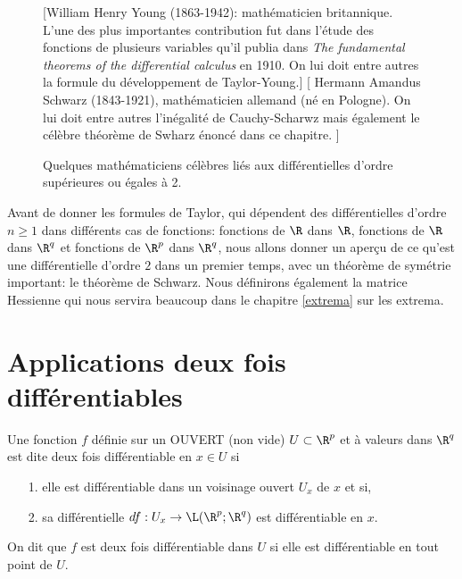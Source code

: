 \documentclass[class=report,crop=false]{standalone}
\begin{document}
\begin{figure}[!h]
    [William Henry Young (1863-1942): mathématicien britannique. L'une
    des plus importantes contribution fut dans l'étude des fonctions de plusieurs variables
    qu'il publia dans \textit{The fundamental theorems of the differential calculus} en 1910. On lui doit entre autres la formule du développement de Taylor-Young.]
    {
        \label{fig:varignon}
    }
    [\color{blue} Hermann Amandus Schwarz (1843-1921), mathématicien allemand (né en Pologne). On lui doit entre autres l'inégalité de Cauchy-Scharwz mais également le célèbre théorème de Swharz énoncé dans ce chapitre. ]
    {
        \label{fig:gateaux}
    }
    \caption{Quelques mathématiciens célèbres liés aux différentielles d'ordre supérieures ou égales à 2.}
    \label{fig:math4}
\end{figure}

Avant de donner les formules de Taylor, qui dépendent des différentielles d'ordre $n \geq 1$ dans différents cas de fonctions: fonctions de $\R$ dans $\R$, fonctions de $\R$ dans $\R^q$ et
fonctions de $\R^p$ dans $\R^q$, nous allons donner un aperçu de ce qu'est une différentielle d'ordre $2$ dans un premier temps, avec un 
théorème de symétrie important: le théorème de Schwarz. Nous définirons également la matrice Hessienne qui nous servira beaucoup
dans le chapitre \ref{extrema}  sur les extrema. 
\section{Applications deux fois différentiables}

\begin{definition}
\textcolor[rgb]{0.73,0.00,0.00}{
Une fonction $f$ d\'efinie sur un OUVERT (non vide) $U \subset \R^p$  et \`a valeurs dans
$\R^q$ est dite deux fois diff\'erentiable en $x \in U$ si
\begin{itemize}
  \item[1.] elle est diff\'erentiable dans un voisinage ouvert $U_x$ de $x$ et si,
  \item[2.] sa diff\'erentielle $df: U_x \rightarrow \L(\R^p;\R^q)$ est diff\'erentiable en $x$.
\end{itemize}
 On dit que $f$ est deux fois diff\'erentiable dans $U$ si elle est diff\'erentiable en tout point de $U$.
}
 \end{definition}
\end{document}
